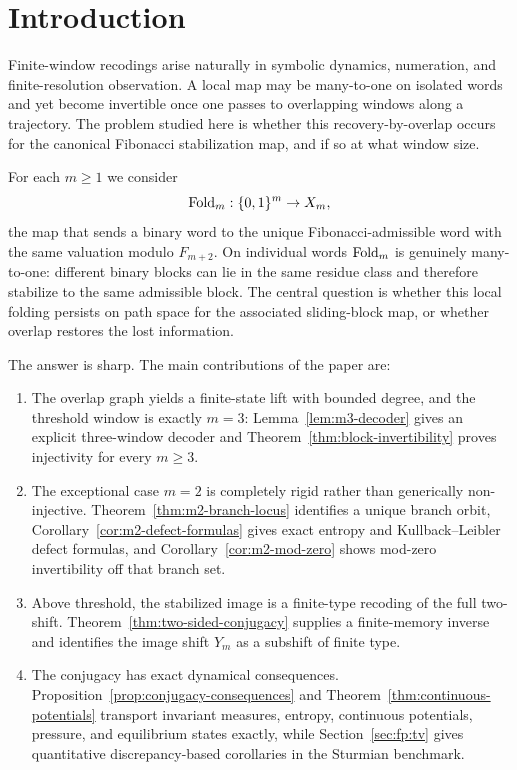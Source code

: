 \section{Introduction}\label{sec:intro}

Finite-window recodings arise naturally in symbolic dynamics, numeration, and finite-resolution observation. A local map may be many-to-one on isolated words and yet become invertible once one passes to overlapping windows along a trajectory. The problem studied here is whether this recovery-by-overlap occurs for the canonical Fibonacci stabilization map, and if so at what window size.

For each $m\ge 1$ we consider
\[
\mathrm{Fold}_m:\{0,1\}^m\to X_m,
\]
the map that sends a binary word to the unique Fibonacci-admissible word with the same valuation modulo $F_{m+2}$. On individual words $\mathrm{Fold}_m$ is genuinely many-to-one: different binary blocks can lie in the same residue class and therefore stabilize to the same admissible block. The central question is whether this local folding persists on path space for the associated sliding-block map, or whether overlap restores the lost information.

The answer is sharp. The main contributions of the paper are:
\begin{enumerate}[label=(\roman*),leftmargin=*,itemsep=2pt]
  \item The overlap graph yields a finite-state lift with bounded degree, and the threshold window is exactly $m=3$: Lemma~\ref{lem:m3-decoder} gives an explicit three-window decoder and Theorem~\ref{thm:block-invertibility} proves injectivity for every $m\ge 3$.
  \item The exceptional case $m=2$ is completely rigid rather than generically non-injective. Theorem~\ref{thm:m2-branch-locus} identifies a unique branch orbit, Corollary~\ref{cor:m2-defect-formulas} gives exact entropy and Kullback--Leibler defect formulas, and Corollary~\ref{cor:m2-mod-zero} shows mod-zero invertibility off that branch set.
  \item Above threshold, the stabilized image is a finite-type recoding of the full two-shift. Theorem~\ref{thm:two-sided-conjugacy} supplies a finite-memory inverse and identifies the image shift $Y_m$ as a subshift of finite type.
  \item The conjugacy has exact dynamical consequences. Proposition~\ref{prop:conjugacy-consequences} and Theorem~\ref{thm:continuous-potentials} transport invariant measures, entropy, continuous potentials, pressure, and equilibrium states exactly, while Section~\ref{sec:fp:tv} gives quantitative discrepancy-based corollaries in the Sturmian benchmark.
\end{enumerate}

